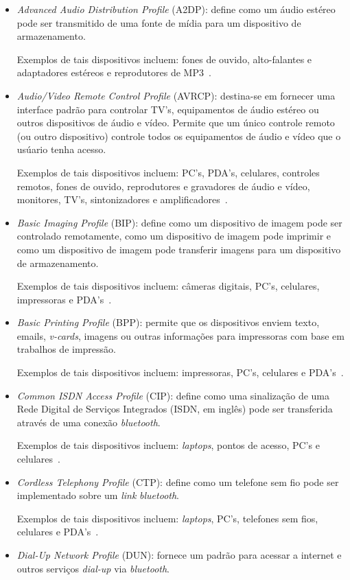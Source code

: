 \begin{itemize}
	\item \emph{Advanced Audio Distribution Profile} (A2DP): define como um áudio estéreo pode ser transmitido de uma fonte de mídia para um dispositivo de armazenamento.

	Exemplos de tais dispositivos incluem: fones de ouvido, alto-falantes e adaptadores estéreos e reprodutores de MP3~\cite{bluetoothprofilesA2DP}.
	\item \emph{Audio/Video Remote Control Profile} (AVRCP): destina-se em fornecer uma interface padrão para controlar TV's, equipamentos de áudio estéreo ou outros dispositivos de áudio e vídeo. Permite que um único controle remoto (ou outro dispositivo) controle todos os equipamentos de áudio e vídeo que o usúario tenha acesso.

	Exemplos de tais dispositivos incluem: PC's, PDA's, celulares, controles remotos, fones de ouvido, reprodutores e gravadores de áudio e vídeo, monitores, TV's, sintonizadores e amplificadores~\cite{bluetoothprofilesAVRCP}.
	\item \emph{Basic Imaging Profile} (BIP): define como um dispositivo de imagem pode ser controlado remotamente, como um dispositivo de imagem pode imprimir e como um dispositivo de imagem pode transferir imagens para um dispositivo de armazenamento.

	Exemplos de tais dispositivos incluem: câmeras digitais, PC's, celulares, impressoras e PDA's~\cite{bluetoothprofilesBIP}.
	\item \emph{Basic Printing Profile} (BPP): permite que os dispositivos enviem texto, emails, \emph{v-cards}, imagens ou outras informações para impressoras com base em trabalhos de impressão.
	
	Exemplos de tais dispositivos incluem: impressoras, PC's, celulares e PDA's~\cite{bluetoothprofilesBPP}.
	\item \emph{Common ISDN Access Profile} (CIP): define como uma sinalização de uma Rede Digital de Serviços Integrados (ISDN, em inglês) pode ser transferida através de uma conexão \emph{bluetooth}.

	Exemplos de tais dispositivos incluem: \emph{laptops}, pontos de acesso, PC's e celulares~\cite{bluetoothprofilesCIP}.
	\item \emph{Cordless Telephony Profile} (CTP): define como um telefone sem fio pode ser implementado sobre um \emph{link} \emph{bluetooth}.

	Exemplos de tais dispositivos incluem: \emph{laptops}, PC's, telefones sem fios, celulares e PDA's~\cite{bluetoothprofilesCTP}.
	\item \emph{Dial-Up Network Profile} (DUN): fornece um padrão para acessar a internet e outros serviços \emph{dial-up} via \emph{bluetooth}.


\end{itemize}
